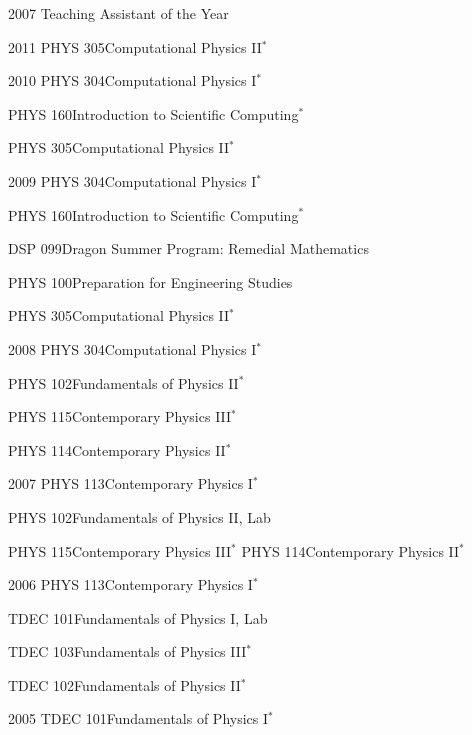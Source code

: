 \documentclass[]{scrartcl}
\begin{document}
\begin{cleanCV}
\WorkExperienceX
{2007}
{Teaching Assistant of the Year} {}

\pagebreak


\newcommand{\TeachingNote}{$^*$}

\Teaching
{2011}
{PHYS 305}{Computational Physics II\TeachingNote}

\Teaching
{2010}
{PHYS 304}{Computational Physics I\TeachingNote}

\Teaching
{}
{PHYS 160}{Introduction to Scientific Computing\TeachingNote}

\Teaching
{}
{PHYS 305}{Computational Physics II\TeachingNote}

\Teaching
{2009}
{PHYS 304}{Computational Physics I\TeachingNote}

\Teaching
{}
{PHYS 160}{Introduction to Scientific Computing\TeachingNote}

\Teaching
{}
{DSP 099}{Dragon Summer Program: Remedial Mathematics}

\Teaching
{}
{PHYS 100}{Preparation for Engineering Studies}


\Teaching
{}
{PHYS 305}{Computational Physics II\TeachingNote}

\Teaching
{2008}
{PHYS 304}{Computational Physics I\TeachingNote}

\Teaching
{}
{PHYS 102}{Fundamentals of Physics II\TeachingNote}

\Teaching
{}
{PHYS 115}{Contemporary Physics III\TeachingNote}

\Teaching
{}
{PHYS 114}{Contemporary Physics II\TeachingNote}

\Teaching
{2007}
{PHYS 113}{Contemporary Physics I\TeachingNote}

\Teaching
{}
{PHYS 102}{Fundamentals of Physics II, Lab}

\Teaching
{}
{PHYS 115}{Contemporary Physics III\TeachingNote}
\Teaching
{}
{PHYS 114}{Contemporary Physics II\TeachingNote}

\Teaching
{2006}
{PHYS 113}{Contemporary Physics I\TeachingNote}

\Teaching
{}
{TDEC 101}{Fundamentals of Physics I, Lab}

\Teaching
{}
{TDEC 103}{Fundamentals of Physics III\TeachingNote}

\Teaching
{}
{TDEC 102}{Fundamentals of Physics II\TeachingNote}

\Teaching
{2005}
{TDEC 101}{Fundamentals of Physics I\TeachingNote}


\end{cleanCV}
\end{document}
